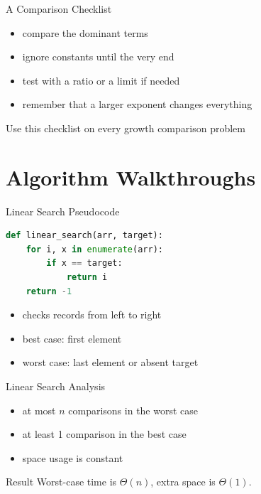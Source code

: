 \documentclass[aspectratio=169,xcolor=dvipsnames]{beamer}
\begin{document}
\begin{frame}{A Comparison Checklist}
  \begin{itemize}
    \item compare the dominant terms
    \item ignore constants until the very end
    \item test with a ratio or a limit if needed
    \item remember that a larger exponent changes everything
  \end{itemize}
  \begin{exampleblock}{Use this checklist on every growth comparison problem}
  \end{exampleblock}
\end{frame}

\section{Algorithm Walkthroughs}
\begin{frame}[fragile]{Linear Search Pseudocode}
  \begin{lstlisting}[language=Python]
def linear_search(arr, target):
    for i, x in enumerate(arr):
        if x == target:
            return i
    return -1
  \end{lstlisting}
  \begin{itemize}
    \item checks records from left to right
    \item best case: first element
    \item worst case: last element or absent target
  \end{itemize}
\end{frame}

\begin{frame}{Linear Search Analysis}
  \begin{itemize}
    \item at most $n$ comparisons in the worst case
    \item at least 1 comparison in the best case
    \item space usage is constant
  \end{itemize}
  \begin{block}{Result}
    Worst-case time is $\Theta(n)$, extra space is $\Theta(1)$.
  \end{block}
\end{frame}
\end{document}
